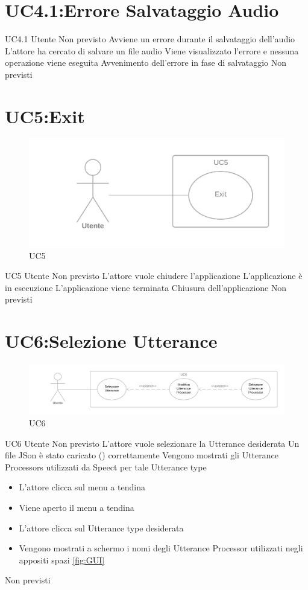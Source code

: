 \documentclass[../AnalisideiRequisiti.tex]{subfiles}
\begin{document}
\section{UC4.1:Errore Salvataggio Audio}
\UserCase
{UC4.1}
{Utente}
{Non previsto}
{Avviene un errore durante il salvataggio dell'audio}
{L'attore ha cercato di salvare un file audio}
{Viene visualizzato l'errore e nessuna operazione viene eseguita}
{Avvenimento dell'errore in fase di salvataggio}
{Non previsti}

\section{UC5:Exit}
\begin{figure}[H]
	\caption{UC5}
	\centering
	\includegraphics[width=\textwidth]{../img/UC05.png}
\end{figure}
\UserCase
{UC5}
{Utente}
{Non previsto}
{L'attore vuole chiudere l'applicazione }
{L'applicazione è in esecuzione}
{L'applicazione viene terminata}
{Chiusura dell'applicazione}
{Non previsti}

\section{UC6:Selezione Utterance}
\begin{figure}[H]
	\caption{UC6}
	\centering
	\includegraphics[width=\textwidth]{../img/UC06.png}
\end{figure}
\UserCase
{UC6}
{Utente}
{Non previsto}
{L'attore vuole selezionare la Utterance desiderata}
{Un file JSon è stato caricato () correttamente }
{Vengono mostrati gli Utterance Processors utilizzati da Speect per tale Utterance type}
{
	\begin{itemize}
		\item{} L'attore clicca sul menu a tendina
		\item{} Viene aperto il menu a tendina
		\item{} L'attore clicca sul Utterance type desiderata
		\item{} Vengono mostrati a schermo i nomi degli Utterance Processor utilizzati negli appositi spazi \ref{fig:GUI}		
	\end{itemize}
}
{Non previsti}
\end{document}
